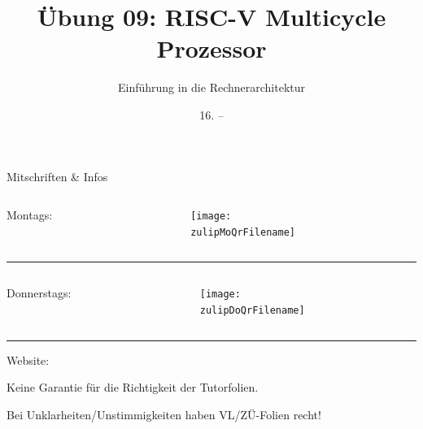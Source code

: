 \documentclass[
  german,            %
  aspectratio=169,    %
]{tumbeamer}
\title{Übung 09: RISC-V Multicycle Prozessor}
\subtitle{Einführung in die Rechnerarchitektur}
\author{\theAuthorName}
\institute{\theGroupName\\\theSchoolName\\\theUniversityName}
\date{16. -- \DTMdisplaydate{2024}{12}{22}{-1}}
\begin{document}
\maketitle

\begin{frame}[c]{Mitschriften \& Infos}{}
  \begin{minipage}[t]{\textwidth}
    \begin{columns}[c]
      \begin{column}{0.8\textwidth}
        Montags: \href{\zulipMo}{\zulipMo}
      \end{column}
      \begin{column}{0.2\textwidth}
        \texttt{[image: \\zulipMoQrFilename]}
      \end{column}
    \end{columns}
  \end{minipage}
  \rule{\textwidth}{0.4pt}
  \begin{minipage}[t]{\textwidth}
    \begin{columns}[c]
      \begin{column}{0.8\textwidth}
        Donnerstags: \href{\zulipDo}{\zulipDo}
      \end{column}
      \begin{column}{0.2\textwidth}
        \texttt{[image: \\zulipDoQrFilename]}
      \end{column}
    \end{columns}
  \end{minipage}
  \ifdefined\myWebsite
  \rule{\textwidth}{0.4pt}
  \centering
  Website: \href{\myWebsite}{\myWebsite}
  \fi
\end{frame}

\begin{frame}[c]{}{}
  \begin{center}
    \LARGE  Keine Garantie für die Richtigkeit der Tutorfolien.

    \Large Bei Unklarheiten/Unstimmigkeiten haben VL/ZÜ-Folien recht!
  \end{center}
\end{frame}
\end{document}
